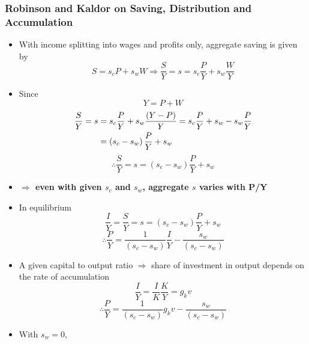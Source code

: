 \documentclass{article}
\begin{document}
\subsubsection{Robinson and Kaldor on Saving, Distribution and Accumulation}
	\begin{itemize}
		\item With income splitting into wages and profits only, aggregate saving is given by 
		\begin{equation}
			S = s_c P + s_w W \Rightarrow \frac{S}{Y}=s=s_c \frac{P}{Y}+s_w\frac{W}{Y} \label{E:4.6}
		\end{equation}
		\item Since
		\begin{equation}
			Y = P + W \label{E:4.7}
		\end{equation}
		\begin{align}
			\frac{S}{Y} = s &= s_c \frac{P}{Y} + s_w\frac{(Y-P)}{Y} = s_c \frac{P}{Y} + s_w - s_w\frac{P}{Y} \\\notag
			&= \left( s_c-s_w \right) \frac{P}{Y} + s_w \label{E:4.8}
		\end{align}
		\begin{equation}
			\therefore \frac{S}{Y} = s = \left( s_c - s_w \right) \frac{P}{Y} + s_w \label{E:4.9}
		\end{equation}
		\item \textbf{\( \Rightarrow \) even with given \( s_c \) and \( s_w \), aggregate \( s \) varies with P/Y}
		\item In equilibrium
		\begin{equation}
			\frac{I}{Y} = \frac{S}{Y} = s = \left( s_c - s_w \right) \frac{P}{Y} + s_w \label{E:4.10}
		\end{equation}
		\begin{equation}
			\therefore \frac{P}{Y} = \frac{1}{\left( s_c - s_w \right)}\frac{I}{Y}-\frac{s_w}{\left( s_c - s_w \right)} \label{E:4.11}
		\end{equation}
		\item A given capital to output ratio \( \Rightarrow \) share of investment in output depends on the rate of accumulation
		\begin{equation}
			\frac{I}{Y} = \frac{I}{K}\frac{K}{Y} = g_k v \label{E:4.12}
		\end{equation}
		\begin{equation}
			\therefore \frac{P}{Y} = \frac{1}{\left( s_c - s_w \right)}g_k v - \frac{s_w}{\left( s_c - s_w \right)} \label{E:4.13}
		\end{equation}
		\item With \( s_w = 0 \),

\end{itemize}
\end{document}
